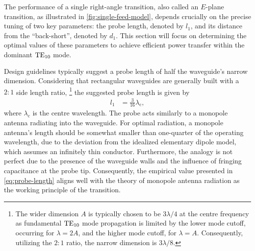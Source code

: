 \documentclass[11pt,a4paper,twoside,openany]{report}
\begin{document}
The performance of a single right-angle transition, also called an $E$-plane transition, as illustrated in \cref{fig:single-feed-model}, depends crucially on the precise tuning of two key parameters: the probe length, denoted by $l_1$, and its distance from the \enquote{back-short}, denoted by $d_1$. This section will focus on determining the optimal values of these parameters to achieve efficient power transfer within the dominant $\text{TE}_{10}$ mode.

Design guidelines typically suggest a probe length of half the waveguide's narrow dimension. Considering that rectangular waveguides are generally built with a $2:1$ side length ratio,%
    \footnote{The wider dimension $A$ is typically chosen to be $3\lambda/4$ at the centre frequency as fundamental $\text{TE}_{10}$ mode propagation is limited by the lower mode cutoff, occurring for $\lambda=2A$, and the higher mode cutoff, for $\lambda = A$. Consequently, utilizing the $2:1$ ratio, the narrow dimension is $3\lambda/8$.}
the suggested probe length is given by
\begin{align}
    \label{eq:probe-length}
    l_1 &= \frac{3}{16}\lambda_{\mathrm c},
\end{align}
where $\lambda_{\mathrm c}$ is the centre wavelength. The probe acts similarly to a monopole antenna radiating into the waveguide. For optimal radiation, a monopole antenna's length should be somewhat smaller than one-quarter of the operating wavelength, due to the deviation from the idealized elementary dipole model, which assumes an infinitely thin conductor. Furthermore, the analogy is not perfect due to the presence of the waveguide walls and the influence of fringing capacitance at the probe tip. Consequently, the empirical value presented in \cref{eq:probe-length} aligns well with the theory of monopole antenna radiation as the working principle of the transition.
\end{document}
